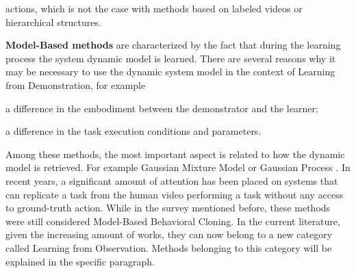 actions, which is not the case with methods based on labeled videos or hierarchical structures.

\textbf{Model-Based methods} are characterized by the fact that during the learning process the system dynamic model is learned. There are several reasons why it may be necessary to use the dynamic system model in the context of Learning from Demonstration, for example \begin{enumerate*}[label=\textbf{(\alph*)}]
    \item a difference in the embodiment between the demonstrator and the learner;
    \item a difference in the task execution conditions and parameters.
\end{enumerate*}
Among these methods, the most important aspect is related to how the dynamic model is retrieved. For example Gaussian Mixture Model \cite{grimes2009learning_actions_through_imitation} or Gaussian Process \cite{englert2013probabilistic,deisenroth2014multi_task}. In recent years, a significant amount of attention has been placed on systems that can replicate a task from the human video performing a task without any access to ground-truth action. While in the survey mentioned before, these methods were still considered Model-Based Behavioral Cloning. In the current literature, given the increasing amount of works, they can now belong to a new category called Learning from Observation. Methods belonging to this category will be explained in the specific paragraph.  